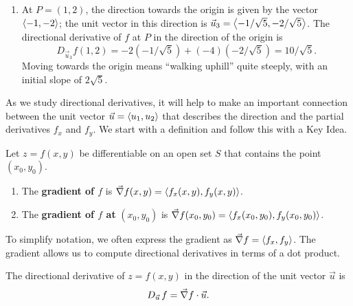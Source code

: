 \begin{example}
\begin{enumerate}
	Finding these directions of ``no elevation change'' is important.
	
	\item		At $P=(1,2)$, the direction towards the origin is given by the vector $\left\langle -1,-2\right\rangle$; the unit vector in this direction is $\vec u_3=\left\langle -1/\sqrt{5},-2/\sqrt{5}\right\rangle$. The directional derivative of $f$ at $P$ in the direction of the origin is
	\[D_{\vec u_3}f(1,2) = -2(-1/\sqrt{5}) + (-4)(-2/\sqrt{5}) = 10/\sqrt{5}%
	.\]
	Moving towards the origin means ``walking uphill'' quite steeply, with an initial slope of $2\sqrt5$.
\end{enumerate}
\end{example}

As we study directional derivatives, it will help to make an important connection between the unit vector $\vec u =\left\langle u_1,u_2\right\rangle$ that describes the direction and the partial derivatives $f_x$ and $f_y$. We start with a definition and follow this with a Key Idea.

\begin{definition}[Gradient]\label{def:gradient}%
Let $z=f(x,y)$ be differentiable on an open set $S$ that contains the point $(x_0,y_0)$.
\begin{enumerate}
	\item The \textbf{gradient of $f$} is $\vec\nabla f(x,y) =\left\langle f_x(x,y),f_y(x,y)\right\rangle$.
	\item The \textbf{gradient of $f$ at} $(x_0,y_0)$ is $\vec\nabla f(x_0,y_0) =\left\langle f_x(x_0,y_0),f_y(x_0,y_0)\right\rangle$.
\end{enumerate}
\end{definition}


To simplify notation, we often express the gradient as $\vec\nabla f =\left\langle f_x, f_y\right\rangle$.
The gradient allows us to compute directional derivatives in terms of a dot product.

\begin{keyidea}\label{idea:gradient_direct}%
The directional derivative of $z=f(x,y)$ in the direction of the unit vector $\vec u$ is
\[D_{\vec u\,}f = \vec\nabla f\cdot \vec u.\]
\end{keyidea}

